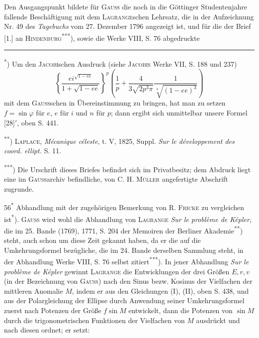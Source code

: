 \indent Den Ausgangspunkt bildete für \textsc{Gauss} die noch in die Göttinger Studentenjahre fallende Beschäftigung mit dem \textsc{Lagrange}schen Lehrsatz, die in der Aufzeichnung Nr. 49 des \textit{Tagebuchs} vom 27. Dezember 1796 angezeigt ist, und für die der Brief [1.] an \textsc{Hindenburg}\textsuperscript{***}), sowie die Werke VIII, S. 76 abgedruckte
\par\medskip\noindent\rule{.24\linewidth}{.4pt}\par\smallskip
\noindent\hspace*{\parindent}\textsuperscript{*}) Um den \textsc{Jacobi}schen Ausdruck (siehe \textsc{Jacobis} Werke VII, S. 188 und 237)
\[
\left\{\frac{e i^{\sqrt{1-ee}}}{1+\sqrt{1-ee}}\right\}^{p}
\left(\frac1p+\frac4{3\sqrt{2p^3\pi}}\frac1{\sqrt[4]{(1-ee)^3}}\right)
\]
\noindent mit dem \textsc{Gauss}schen in Übereinstimmung zu bringen, hat man zu setzen \(f=\sin\varphi\) für \(e\), \(e\) für \(i\) und \(n\) für \(p\); dann ergibt sich unmittelbar unsere Formel [28]$'$, oben S. 441.
\par\noindent\hspace*{\parindent}\textsuperscript{**}) \textsc{Laplace}, \textit{Mécanique céleste}, t. V, 1825, Suppl. \textit{Sur le développement des coord. ellipt.} S. 11.
\par\noindent\hspace*{\parindent}\textsuperscript{***}) Die Urschrift dieses Briefes befindet sich im Privatbesitz; dem Abdruck liegt eine im \textsc{Gauss}archiv befindliche, von C. H. \textsc{Müller} angefertigte Abschrift zugrunde.
\par\smallskip\hfill 56\textsuperscript{*}
\clearpage{}
\noindent Abhandlung mit der zugehörigen Bemerkung von R. \textsc{Fricke} zu vergleichen ist\textsuperscript{*}). \textsc{Gauss} wird wohl die Abhandlung von \textsc{Lagrange} \textit{Sur le problème de Képler}, die im 25. Bande (1769), 1771, S. 204 der Memoiren der Berliner Akademie\textsuperscript{**}) steht, auch schon um diese Zeit gekannt haben, da er die auf die Umkehrungsformel bezügliche, die im 24. Bande derselben Sammlung steht, in der Abhandlung Werke VIII, S. 76 selbst zitiert\textsuperscript{***}). In jener Abhandlung \textit{Sur le problème de Képler} gewinnt \textsc{Lagrange} die Entwicklungen der drei Größen \(E,r,v\) (in der Bezeichnung von \textsc{Gauss}) nach den Sinus bezw. Kosinus der Vielfachen der mittleren Anomalie \(M\), indem er aus den Gleichungen (I), (II), oben S. 438, und aus der Polargleichung der Ellipse durch Anwendung seiner Umkehrungsformel zuerst nach Potenzen der Größe \(f\sin M\) entwickelt, dann die Potenzen von \(\sin M\) durch die trigonometrischen Funktionen der Vielfachen von \(M\) ausdrückt und nach diesen ordnet; er setzt:
